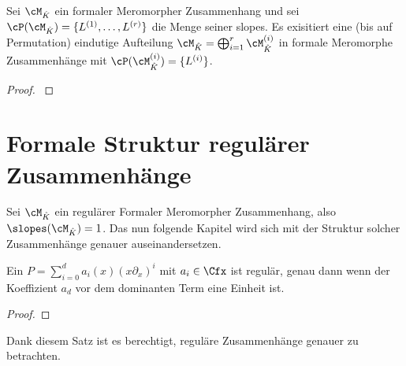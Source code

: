\begin{thm}
\cite[Thm 5.3.1]{sabbah_cimpa90}
Sei $\cM_{\hat{K}}$ ein formaler Meromorpher Zusammenhang und sei
$\cP(\cM_{\hat K})=\{L^{(1)},\dots,L^{(r)}\}$ die Menge seiner slopes. Es
exisitiert eine (bis auf Permutation) eindutige Aufteilung $\cM_{\hat
K}=\bigoplus_{i=1}^r\cM_{\hat K}^{(i)}$ in formale Meromorphe Zusammenhänge
mit $\cP(\cM_{\hat K}^{(i)})=\{L^{(i)}\}$.
\end{thm}
\begin{proof}
\cite[Thm 5.3.1]{sabbah_cimpa90}
\end{proof}
\begin{comment}
Aussagen, die aus dem Beweis entstehen:\\
Wir erhalten die Exacte Sequenz
\[
0 \rightarrow \cD_{\hat K}/\cD_{\hat K} \cdot P_1
  \rightarrow \cD_{\hat K}/\cD_{\hat K} \cdot P
  \rightarrow \cD_{\hat K}/\cD_{\hat K} \cdot P_2
  \rightarrow 0
\]
\begin{cor}
\cite[Thm 5.3.4]{sabbah_cimpa90}
$\cP(P)=\cP(P_1)\cup\cP(P_2)$ und $\cP(P_1)\cap\cP(P_2)=\emptyset$
\end{cor}
\end{comment}

\section{Formale Struktur regulärer Zusammenhänge}
\cite[Chap 5.2]{sabbah_cimpa90}
Sei $\cM_{\hat K}$ ein regulärer Formaler Meromorpher Zusammenhang, also
$\slopes(\cM_{\hat K})=1$. Das nun folgende Kapitel wird sich mit der
Struktur solcher Zusammenhänge genauer auseinandersetzen.

\begin{lem}
\cite[Def 5.1.1 Remarks 3.]{sabbah_cimpa90}
Ein $P=\sum_{i=0}^d a_i(x)(x\partial_x)^i$ mit $a_i\in\Cfx$ ist regulär, genau
dann wenn der Koeffizient $a_d$ vor dem dominanten Term eine Einheit ist.
\end{lem}
\begin{proof}

\end{proof}

Dank diesem Satz ist es berechtigt, reguläre Zusammenhänge genauer zu
betrachten.

